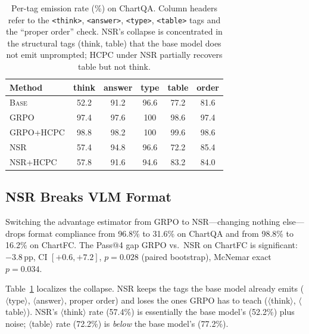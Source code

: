 \documentclass[11pt]{article}
\begin{document}
\begin{table}[t]
\centering
\footnotesize
\setlength{\tabcolsep}{3.5pt}
\begin{tabular}{lccccc}
\toprule
Method & think & answer & type & table & order\\
\midrule
\textsc{Base}      & 52.2 & 91.2 & 96.6 & 77.2 & 81.6\\
\textsc{GRPO}      & 97.4 & 97.6 & 100  & 98.6 & 97.4\\
\textsc{GRPO+HCPC} & 98.8 & 98.2 & 100  & 99.6 & 98.6\\
\textsc{NSR}       & 57.4 & 94.8 & 96.6 & 72.2 & 85.4\\
\textsc{NSR+HCPC}  & 57.8 & 91.6 & 94.6 & 83.2 & 84.0\\
\bottomrule
\end{tabular}
\caption{Per-tag emission rate (\%) on ChartQA. Column headers refer
to the \texttt{<think>}, \texttt{<answer>}, \texttt{<type>},
\texttt{<table>} tags and the ``proper order'' check. NSR's collapse
is concentrated in the structural tags (think, table) that the base
model does not emit unprompted; HCPC under NSR partially recovers
table but not think.}
\label{tab:tags}
\end{table}

\subsection{NSR Breaks VLM Format}
\label{sec:nsr_collapse}

Switching the advantage estimator from GRPO to NSR---changing nothing
else---drops format compliance from 96.8\% to 31.6\% on ChartQA and
from 98.8\% to 16.2\% on ChartFC. The Pass@4 gap GRPO vs.\ NSR on
ChartFC is significant: $-3.8$\,pp, CI $[+0.6,+7.2]$, $p{=}0.028$
(paired bootstrap), McNemar exact $p{=}0.034$.

Table~\ref{tab:tags} localizes the collapse. NSR keeps the tags the
base model already emits ($\langle$type$\rangle$,
$\langle$answer$\rangle$, proper order) and loses the ones GRPO has to
teach ($\langle$think$\rangle$, $\langle$table$\rangle$). NSR's
$\langle$think$\rangle$ rate (57.4\%) is essentially the base model's
(52.2\%) plus noise; $\langle$table$\rangle$ rate (72.2\%) is
\emph{below} the base model's (77.2\%).
\end{document}
